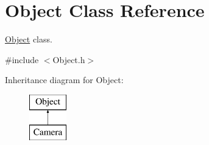 \hypertarget{class_object}{}\section{Object Class Reference}
\label{class_object}


\hyperlink{class_object}{Object} class.  




{\ttfamily \#include $<$Object.\+h$>$}

Inheritance diagram for Object\+:\begin{figure}[H]
\begin{center}
\leavevmode
\includegraphics[height=2.000000cm]{class_object}
\end{center}
\end{figure}
